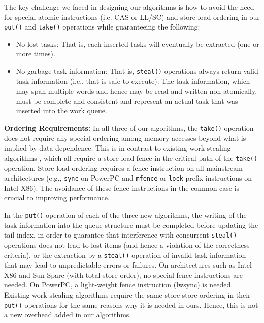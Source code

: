 The key challenge we faced in designing our algorithms is how to avoid
the need for special atomic instructions (i.e. CAS or LL/SC) and
store-load ordering in our \lstinline!put()! and \lstinline!take()!
operations while guaranteeing the following:

\begin{itemize}
\item No lost tasks: That is, each inserted tasks will eventually be
  extracted (one or more times).
\item No garbage task information: That is, \lstinline!steal()!
  operations always return valid task information (i.e., that is safe
  to execute). The task information, which may span multiple words and
  hence may be read and written non-atomically, must be complete and
  consistent and represent an actual task that was inserted into the
  work queue.
\end{itemize}

\textbf{Ordering Requirements:} In all three of our algorithms, the
\lstinline!take()! operation does not require any special ordering among
memory accesses beyond what is implied by data dependence. This is in
contrast to existing work stealing algorithms \cite{Arora2001,
  Chase2005, Frigo1998, Hendler2006, Hendler2002}, which all require a
store-load fence in the critical path of the \lstinline!take()!
operation. Store-load ordering requires a fence instruction on all
mainstream architectures (e.g., \lstinline!sync! on PowerPC and
\lstinline!mfence! or \lstinline!lock! prefix instructions on Intel
X86). The avoidance of these fence instructions in the common case is
crucial to improving performance.

In the \lstinline!put()! operation of each of the three new algorithms,
the writing of the task information into the queue structure must be
completed before updating the tail index, in order to guarantee that
interference with concurrent \lstinline!steal()! operations does not
lead to lost items (and hence a violation of the correctness
criteria), or the extraction by a \lstinline!steal()! operation of
invalid task information that may lead to unpredictable errors or
failures. On architectures such as Intel X86 and Sun Sparc (with total
store order), no special fence instructions are needed. On PowerPC, a
light-weight fence instruction (lwsync) is needed. Existing work
stealing algorithms \cite{Arora2001, Chase2005, Frigo1998,
  Hendler2006, Hendler2002} require the same store-store ordering in
their \lstinline!put()! operations for the same reasons why it is needed
in ours. Hence, this is not a new overhead added in our algorithms.

